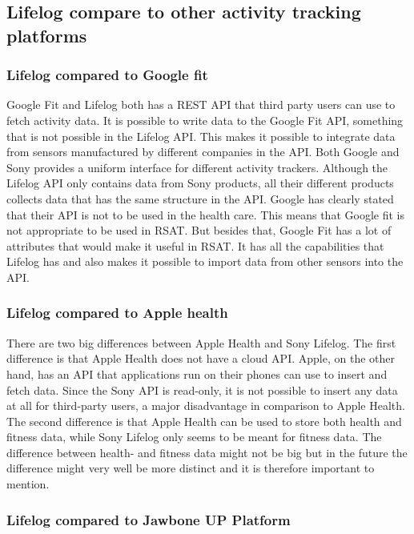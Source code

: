 \documentclass{cslthse-msc}
\begin{document}
\subsection{Lifelog compare to other activity tracking platforms}

\subsubsection{Lifelog compared to Google fit}
Google Fit and Lifelog both has a REST API that third party users can use to fetch activity data. It is possible to write data to the Google Fit API, something that is not possible in the Lifelog API. This makes it possible to integrate data from sensors manufactured by different companies in the API. Both Google and Sony provides a uniform interface for different activity trackers. Although the Lifelog API only contains data from Sony products, all their different products collects data that has the same structure in the API. Google has clearly stated that their API is not to be used in the health care. This means that Google fit is not appropriate to be used in RSAT. But besides that, Google Fit has a lot of attributes that would make it useful in RSAT. It has all the capabilities that Lifelog has and also makes it possible to import data from other sensors into the API. 



\subsubsection{Lifelog compared to Apple health} 
There are two big differences between Apple Health and Sony Lifelog. The first difference is that Apple Health does not have a cloud API. Apple, on the other hand, has an API that applications run on their phones can use to insert and fetch data. Since the Sony API is read-only, it is not possible to insert any data at all for third-party users, a major disadvantage in comparison to Apple Health. The second difference is that Apple Health can be used to store both health and fitness data, while Sony Lifelog only seems to be meant for fitness data. The difference between health- and fitness data might not be big but in the future the difference might very well be more distinct and it is therefore important to mention. 

\subsubsection{Lifelog compared to Jawbone UP Platform}
\end{document}
